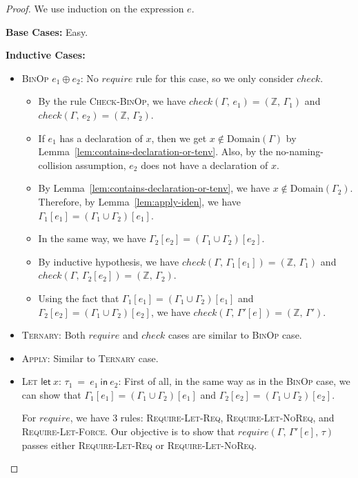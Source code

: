\documentclass[peerreview, 10pt]{IEEEtran}
\newcommand{\Z}{\ensuremath{\mathbb{Z}}}
\newcommand{\lett}[4]{\ensuremath{\mathsf{let}\ #1\mathsf{:}\,#2\ \mathsf{=}\ #3\ \mathsf{in}\ #4}}
\newcommand{\binop}[2]{\ensuremath{#1\ \mathsf{\oplus}\ #2}}
\newcommand{\checktype}[4]{\ensuremath{{check}(#1,\,#2)=(#3,\,#4)}}
\newcommand{\domain}[1]{\ensuremath{\text{Domain}(#1)}}
\begin{document}
\begin{proof}
    We use induction on the expression $e$.

    \textbf{Base Cases:} Easy.

    \textbf{Inductive Cases:}
    \begin{itemize}
        \item \textsc{BinOp} \binop{e_1}{e_2}: No $require$ rule for this case, so we only consider $check$.
        \begin{itemize}
            \item By the rule \textsc{Check-BinOp}, we have $\checktype{\Gamma}{e_1}{\Z}{\Gamma_1}$ and $\checktype{\Gamma}{e_2}{\Z}{\Gamma_2}$.
            \item If $e_1$ has a declaration of $x$, then we get $x\notin\domain{\Gamma}$ by Lemma~\ref{lem:contains-declaration-or-tenv}. Also, by the no-naming-collision assumption, $e_2$ does not have a declaration of $x$. 
            \item By Lemma~\ref{lem:contains-declaration-or-tenv}, we have $x\notin\domain{\Gamma_2}$. Therefore, by Lemma~\ref{lem:apply-iden}, we have $\Gamma_1[e_1]=(\Gamma_1\cup\Gamma_2)[e_1]$. 
            \item In the same way, we have $\Gamma_2[e_2]=(\Gamma_1\cup\Gamma_2)[e_2]$.
            \item By inductive hypothesis, we have $\checktype{\Gamma}{\Gamma_1[e_1]}{\Z}{\Gamma_1}$ and $\checktype{\Gamma}{\Gamma_2[e_2]}{\Z}{\Gamma_2}$.
            \item Using the fact that $\Gamma_1[e_1]=(\Gamma_1\cup\Gamma_2)[e_1]$ and $\Gamma_2[e_2]=(\Gamma_1\cup\Gamma_2)[e_2]$, we have $\checktype{\Gamma}{\Gamma'[e]}{\Z}{\Gamma'}$.
        \end{itemize}
        \item \textsc{Ternary}: Both $require$ and $check$ cases are similar to \textsc{BinOp} case.
        \item \textsc{Apply}: Similar to \textsc{Ternary} case.
        \item \textsc{Let} \lett{x}{\tau_1}{e_1}{e_2}: 
        First of all, in the same way as in the \textsc{BinOp} case, we can show that $\Gamma_1[e_1]=(\Gamma_1\cup\Gamma_2)[e_1]$ and $\Gamma_2[e_2]=(\Gamma_1\cup\Gamma_2)[e_2]$. 
        
        For $require$, we have 3 rules: \textsc{Require-Let-Req}, \textsc{Require-Let-NoReq}, and \textsc{Require-Let-Force}. Our objective is to show that $require(\Gamma,\,\Gamma'[e],\,\tau)$ passes either \textsc{Require-Let-Req} or \textsc{Require-Let-NoReq}.
        

\end{itemize}
\end{proof}
\end{document}
